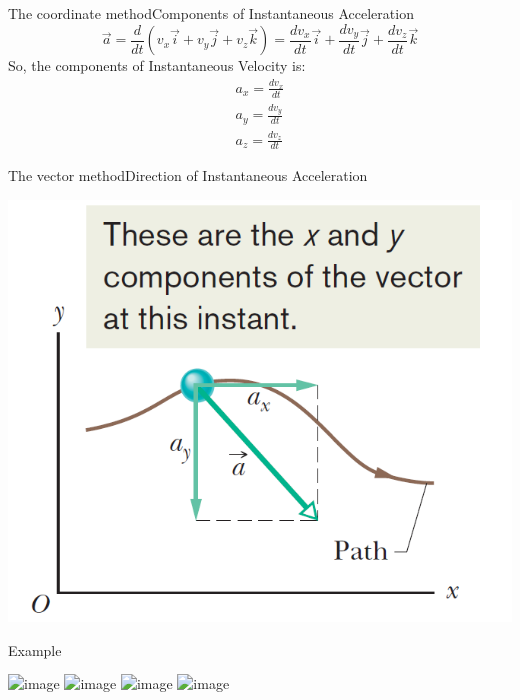 \documentclass[18pt]{LectMechanics}
\begin{document}
\begin{frame}{The coordinate method}{Components of Instantaneous Acceleration}
	\begin{equation*}
		\vec a = \frac{d}{dt} (v_x\vec i + v_y\vec j + v_z\vec k) = \frac{dv_x}{dt}\vec i + \frac{dv_y}{dt}\vec j + \frac{dv_z}{dt}\vec k
	\end{equation*}
	So, the components of Instantaneous Velocity is:
	\begin{align*}
		a_x = 	\frac{dv_x}{dt} \\
		a_y = 	\frac{dv_y}{dt} \\
		a_z = 	\frac{dv_z}{dt}
	\end{align*}
\end{frame}


\begin{frame}{The vector method}{Direction of Instantaneous Acceleration}

	\includegraphics[width=0.7\linewidth]{Instantaneous_Acceleration}
\end{frame}


\begin{frame}{Example}
	\begin{center}
		\includegraphics<1>[width=\linewidth]{Rabbit_1}
		\includegraphics<2>[width=\linewidth]{Rabbit_2}
		\includegraphics<3>[width=0.9\linewidth]{Rabbit_3}
		\includegraphics<4>[width=0.7\linewidth]{Rabbit_4}
	\end{center}
\end{frame}
\end{document}
